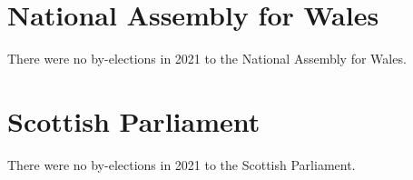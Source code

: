 \documentclass[a4paper,openany]{book}
\begin{document}
\section{National Assembly for Wales}

There were no by-elections in 2021 to the National Assembly for Wales.


\section{Scottish Parliament}

There were no by-elections in 2021 to the Scottish Parliament.

%
%
%

%
%
\end{document}
